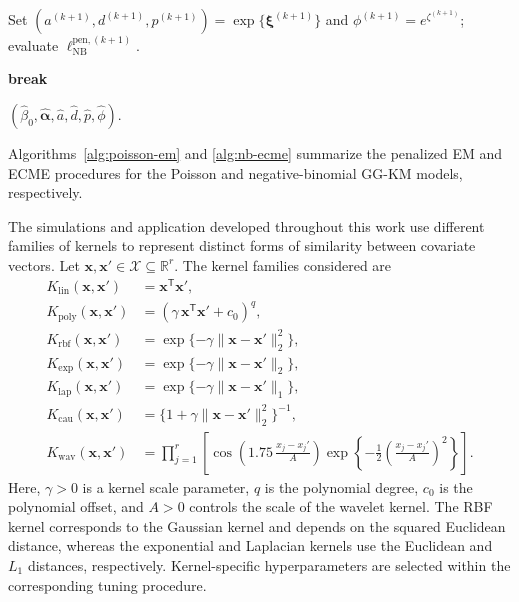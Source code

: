 \begin{algorithm*}[tbp]
\begin{algorithmic}[1]
			\State Set
			$(a^{(k+1)},d^{(k+1)},p^{(k+1)})
			=\exp\{\bm\xi^{(k+1)}\}$ and
			$\phi^{(k+1)}=e^{\zeta^{(k+1)}}$;
			evaluate $\ell_{\mathrm{NB}}^{\mathrm{pen},(k+1)}$.

				\State \textbf{break}
			\EndIf

		\EndFor

		\State \Return
		$(\widehat\beta_0,\widehat{\bm\alpha},
		\widehat a,\widehat d,\widehat p,\widehat\phi)$.

	\end{algorithmic}
\end{algorithm*}

Algorithms~\ref{alg:poisson-em} and \ref{alg:nb-ecme} summarize the
penalized EM and ECME procedures for the Poisson and negative-binomial
GG-KM models, respectively.

The simulations and application developed throughout this work use different
families of kernels to represent distinct forms of similarity between
covariate vectors. Let $\bm{x},\bm{x}'\in\mathcal X\subseteq\mathbb R^r$.
The kernel families considered are
\begin{equation}
	\begin{aligned}
		K_{\mathrm{lin}}(\bm{x},\bm{x}')
		&=\bm{x}^{\mathsf T}\bm{x}',\\
		K_{\mathrm{poly}}(\bm{x},\bm{x}')
		&=(\gamma\,\bm{x}^{\mathsf T}\bm{x}'+c_0)^q,\\
		K_{\mathrm{rbf}}(\bm{x},\bm{x}')
		&=\exp\{-\gamma\|\bm{x}-\bm{x}'\|_2^2\},\\
		K_{\mathrm{exp}}(\bm{x},\bm{x}')
		&=\exp\{-\gamma\|\bm{x}-\bm{x}'\|_2\},\\
		K_{\mathrm{lap}}(\bm{x},\bm{x}')
		&=\exp\{-\gamma\|\bm{x}-\bm{x}'\|_1\},\\
		K_{\mathrm{cau}}(\bm{x},\bm{x}')
		&=\{1+\gamma\|\bm{x}-\bm{x}'\|_2^2\}^{-1},\\
		K_{\mathrm{wav}}(\bm{x},\bm{x}')
		&=
		\prod_{j=1}^{r}
		\left[
		\cos\!\left(
		1.75\,\frac{x_j-x_j'}{A}
		\right)
		\exp\!\left\{
		-\frac{1}{2}
		\left(
		\frac{x_j-x_j'}{A}
		\right)^2
		\right\}
		\right].
	\end{aligned}
	\label{eq:kernels}
\end{equation}
Here, $\gamma>0$ is a kernel scale parameter, $q$ is the polynomial degree,
$c_0$ is the polynomial offset, and $A>0$ controls the scale of the
wavelet kernel. The RBF kernel corresponds to the Gaussian kernel and
depends on the squared Euclidean distance, whereas the exponential and
Laplacian kernels use the Euclidean and $L_1$ distances, respectively.
Kernel-specific hyperparameters are selected within the corresponding
tuning procedure.

